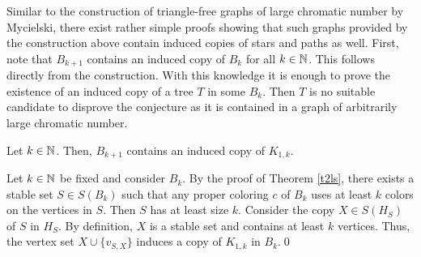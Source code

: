 \begin{comment}
Now we want to construct $\mathcal{P}_{k+1}$. For each $p\in\mathcal{P}_k$ and every $q\in\mathcal{P}_{p}$ let $\mathcal{L}(p)$ be the set of segments in $\mathcal{P}_k$ intersecting $p$ and $\mathcal{L}_p(q)$ the segments in $\mathcal{L}(p)$ intersecting $q$. We add two probes to $\mathcal{P}_{k+1}$. We place the first one, the upper probe $u_q$, close to the top of $q$, such that the diagonal $d_q$ but no other segment in $\mathcal{L}_p(q)$ intersects it and choose the second probe, the lower probe $l_q$, close to the bottom of $q$ such that it contains all segments in $\mathcal{L}_p(q)$ but not $d_q$. Then, both probes end at the right boundary of $R$. By the induction hypothesis and the way we placed $\mathcal{L}_p$, $\mathcal{L}(p)\cup \lbrace d_q\rbrace$ and $\mathcal{L}(p)\cup\mathcal{L}_p(q)$ are both independent sets, i.e. both $u_q$ and $l_q$ are proper probes. Finally, observe that $\vert \mathcal{P}_{k+1}\vert = 2p_k^2=p_{k+1}$.

Let $c$ be a coloring of $\mathcal{L}_{k+1}$. Consider the restriction of $c$ to the original copy of $\mathcal{L}_k$. By the induction hypothesis, there exists a probe $p\in\mathcal{P}_k$ for which $c$ needs $k$ colors to paint the line segments in $p$. Now, consider the copy $\mathcal{L}_p$ of $\mathcal{L}_k$ in the root of $p$. Again, by induction hypothesis, there is a probe $q\in\mathcal{P}_p$ that uses $k$ colors on the segments in $\mathcal{L}_p$ intersecting $q$. If the colors used by $c$ in $p$ and $q$ are different, at least $k+1$ colors are used on the segments pierced by the lower probe $l_q$. Otherwise, $d_q$ has a different color than the colors used in $p$ and $q$ and thus, $c$ uses $k+1$ colors on the segments pierced by the upper probe $u_q$.\qed
\end{prf}
\end{comment}
Similar to the construction of triangle-free graphs of large chromatic number by Mycielski, there exist rather simple proofs showing that such graphs provided by the construction above contain induced copies of stars and paths as well.
First, note that $B_{k+1}$ contains an induced copy of $B_k$ for all $k\in\mathbb{N}$. This follows directly from the construction. With this knowledge it is enough to prove the existence of an induced copy of a tree $T$ in some $B_k$. Then $T$ is no suitable candidate to disprove the conjecture as it is contained in a graph of arbitrarily large chromatic number.

\begin{thm}
Let $k\in\mathbb{N}$. Then, $B_{k+1}$ contains an induced copy of $K_{1,k}$.
\end{thm}
\begin{prf}
Let $k\in\mathbb{N}$ be fixed and consider $B_k$. By the proof of Theorem \ref{t2ls}, there exists a stable set $S\in S(B_k)$ such that any proper coloring $c$ of $B_k$ uses at least $k$ colors on the vertices in $S$. Then $S$ has at least size $k$. Consider the copy $X\in S(H_S)$ of $S$ in $H_S$. By definition, $X$ is a stable set and contains at least $k$ vertices. Thus, the vertex set $X\cup \lbrace v_{S,X}\rbrace$ induces a copy of $K_{1,k}$ in $B_k$.\qed   
\end{prf}

